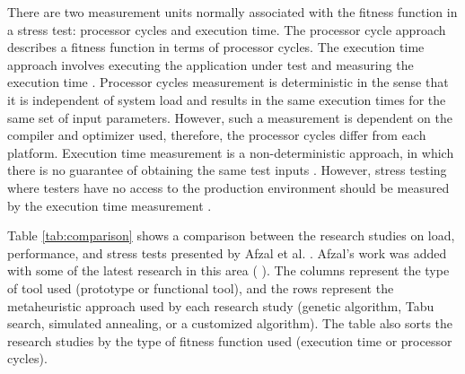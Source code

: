 \documentclass{report}
\begin{document}
There are two measurement units normally associated with the fitness function in a stress test: processor cycles and execution time. The processor cycle approach describes a fitness function in terms of processor cycles. The execution time approach involves executing the application under test and measuring the execution time \cite{Afzal2009a} \cite{tracey2000search}. Processor cycles measurement is deterministic in the sense that it is independent of system load and results in the same execution times for the same set of input parameters. However, such a measurement is dependent on the compiler and optimizer used, therefore, the processor cycles differ from each platform. Execution time measurement is a non-deterministic approach, in which there is no guarantee of obtaining the same test inputs \cite{Afzal2009a}.  However, stress testing where testers have no access to the production environment should be measured by the execution time measurement \cite{Molyneaux2009} \cite{Afzal2009a}.

Table \ref{tab:comparison}  shows a comparison between the research studies on load, performance, and stress tests presented by Afzal et al. \cite{Afzal2009a}. Afzal's work was added with some of the latest research in this area (\cite{Garousi2006} \cite{Garousi2010} \cite{DiAlesio2013} \cite{DiAlesio2014} \cite{Alesio2015} \cite{Gois2016} ). The columns represent the type of tool used (prototype or functional tool), and the rows represent the metaheuristic approach used by each research study (genetic algorithm, Tabu search, simulated annealing, or a customized algorithm). The table also sorts the research studies by the type of fitness function used (execution time or processor cycles). 
\end{document}
